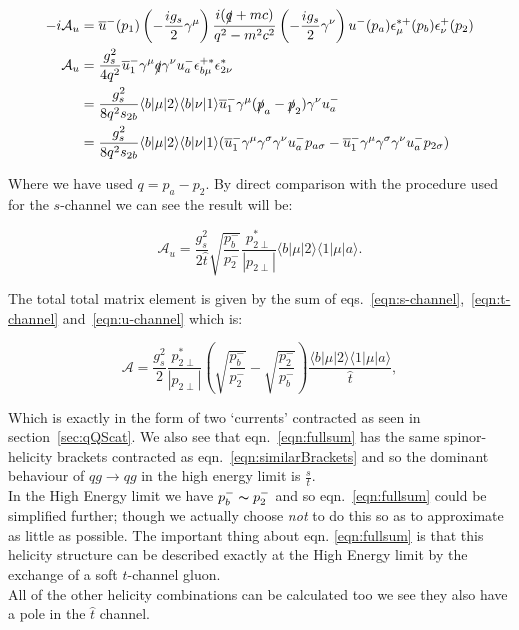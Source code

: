 			\begin{equation}
			\begin{split}
			-i\mathcal{A}_u &= \overline{u}^-(p_1)\left(-\frac{ig_s}{2}\gamma^\mu\right)\frac{i(\slashed q+mc)}{q^2-m^2c^2}\left(-\frac{ig_s}{2}\gamma^\nu\right)u^-(p_a)\epsilon_\mu^{*+}(p_b)\epsilon^+_\nu(p_2)\\
			\mathcal{A}_u &= \frac{g_s^2}{4q^2}\overline{u}^-_1\gamma^\mu\slashed q\gamma^\nu u^-_a\epsilon^{+*}_{b\mu}\epsilon^*_{2\nu}\\
			&= \frac{g_s^2}{8q^2s_{2b}}\langle b|\mu|2\rangle\langle b|\nu|1\rangle\overline{u}^-_1\gamma^\mu(\slashed{p}_a-\slashed{p}_2)\gamma^\nu u^-_a\\
			&= \frac{g_s^2}{8q^2s_{2b}}\langle b|\mu|2\rangle\langle b|\nu|1\rangle(\overline{u}^-_1\gamma^\mu\gamma^\sigma\gamma^\nu u^-_ap_{a\sigma} - \overline{u}^-_1\gamma^\mu\gamma^\sigma \gamma^\nu u^-_ap_{2\sigma})
			\end{split}
			\end{equation}

			Where we have used $q=p_a-p_2$.  By direct comparison with the procedure used for the $s$-channel we can see the result will be:

			\begin{equation}
			\mathcal{A}_u=\frac{g_s^2}{2\hat{t}}\sqrt{\frac{p_b^-}{p_2^-}}\frac{p^*_{2\perp}}{|p_{2\perp}|}\langle{b}|\mu|2\rangle\langle{1}|\mu|a\rangle.
			\label{eqn:u-channel}
			\end{equation}

			The total total matrix element is given by the sum of eqs.~\eqref{eqn:s-channel},~\eqref{eqn:t-channel} and~\eqref{eqn:u-channel} which is:

			\begin{equation}
				\mathcal{A}=\frac{g_s^2}{2}\frac{p_{2\perp}^*}{|p_{2\perp}|}\left(\sqrt{\frac{p_b^-}{p_2^-}}-\sqrt{\frac{p_2^-}{p_b^-}}\right)\frac{\langle{b}|\mu|2\rangle\langle{1}|\mu|a\rangle}{\hat{t}},
				\label{eqn:fullsum}
			\end{equation}

			Which is exactly in the form of two `currents' contracted as seen in section~\ref{sec:qQScat}.  We also
			see that eqn.~\eqref{eqn:fullsum} has the same spinor-helicity brackets contracted as eqn.~\eqref{eqn:similarBrackets}
			and so the dominant behaviour of $qg\rightarrow qg$ in the high energy limit is $\frac{s}{t}$.\\In the High Energy
			limit we have $p_b^-\thicksim p_2^-$ and so eqn.~\eqref{eqn:fullsum} could be simplified further; though we
			actually choose \emph{not} to do this so as to approximate as little as possible.  The important thing about eqn.
			\eqref{eqn:fullsum} is that this helicity structure can be described exactly at the High Energy limit by the
			exchange of a soft $t$-channel gluon.\\  All of the other helicity combinations can be calculated too we see
			they also have a pole in the $\hat t$ channel.

